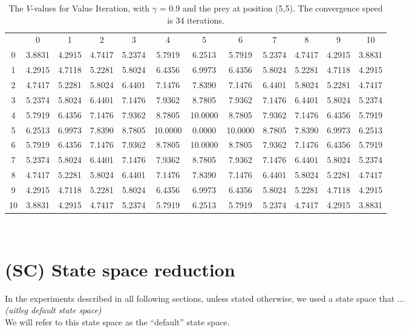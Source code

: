 \documentclass{article}
\begin{document}
\begin{landscape}
\begin{table}[tbp]
\centering
\begin{tabular} {c c c c c c c c c c c c}
 & 0 & 1 & 2 & 3 & 4 & 5 & 6 & 7 & 8 & 9 & 10 \\
0 &  3.8831 &  4.2915 &  4.7417 &  5.2374 &  5.7919 &  6.2513 &  5.7919 &  5.2374 &  4.7417 &  4.2915 &  3.8831\\
1 &  4.2915 &  4.7118 &  5.2281 &  5.8024 &  6.4356 &  6.9973 &  6.4356 &  5.8024 &  5.2281 &  4.7118 &  4.2915\\
2 &  4.7417 &  5.2281 &  5.8024 &  6.4401 &  7.1476 &  7.8390 &  7.1476 &  6.4401 &  5.8024 &  5.2281 &  4.7417\\
3 &  5.2374 &  5.8024 &  6.4401 &  7.1476 &  7.9362 &  8.7805 &  7.9362 &  7.1476 &  6.4401 &  5.8024 &  5.2374\\
4 &  5.7919 &  6.4356 &  7.1476 &  7.9362 &  8.7805 & 10.0000 &  8.7805 &  7.9362 &  7.1476 &  6.4356 &  5.7919\\
5 &  6.2513 &  6.9973 &  7.8390 &  8.7805 & 10.0000 &  0.0000 & 10.0000 &  8.7805 &  7.8390 &  6.9973 &  6.2513\\
6 &  5.7919 &  6.4356 &  7.1476 &  7.9362 &  8.7805 & 10.0000 &  8.7805 &  7.9362 &  7.1476 &  6.4356 &  5.7919\\
7 &  5.2374 &  5.8024 &  6.4401 &  7.1476 &  7.9362 &  8.7805 &  7.9362 &  7.1476 &  6.4401 &  5.8024 &  5.2374\\
8 &  4.7417 &  5.2281 &  5.8024 &  6.4401 &  7.1476 &  7.8390 &  7.1476 &  6.4401 &  5.8024 &  5.2281 &  4.7417\\
9 &  4.2915 &  4.7118 &  5.2281 &  5.8024 &  6.4356 &  6.9973 &  6.4356 &  5.8024 &  5.2281 &  4.7118 &  4.2915\\
10 &  3.8831 &  4.2915 &  4.7417 &  5.2374 &  5.7919 &  6.2513 &  5.7919 &  5.2374 &  4.7417 &  4.2915 &  3.8831\\\end{tabular}\\
\caption{The $V$-values for Value Iteration, with $\gamma$ = 0.9 and the prey at position (5,5). The convergence speed is 34 iterations.}
\label{valueiteration4}
\end{table}


\end{landscape}


\section{(SC) State space reduction}
In the experiments described in all following sections, unless stated otherwise, we used a state space that ...\\
\emph{ (uitleg default state space)}\\
We will refer to this state space as the ``default'' state space.\\
\end{document}
